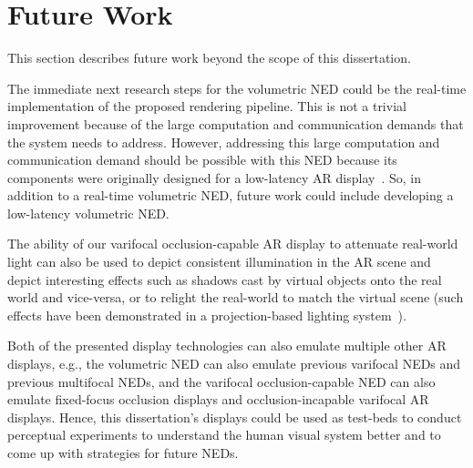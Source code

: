 \section{Future Work}
This section describes future work beyond the scope of this dissertation.

The immediate next research steps for the volumetric NED could be the real-time implementation of the proposed rendering pipeline. This is not a trivial improvement because of the large computation and communication demands that the system needs to address. However, addressing this large computation and communication demand should be possible with this NED because its components were originally designed for a low-latency AR display~\cite{Lincoln2016motion}. So, in addition to a real-time volumetric NED, future work could include developing a low-latency volumetric NED.

The ability of our varifocal occlusion-capable AR display to attenuate real-world light can also be used to depict consistent illumination in the AR scene and depict interesting effects such as shadows cast by virtual objects onto the real world and vice-versa, or to relight the real-world to match the virtual scene (such effects have been demonstrated in a projection-based lighting system~\cite{bimber2003consistent}).

Both of the presented display technologies can also emulate multiple other AR displays, e.g., the volumetric NED can also emulate previous varifocal NEDs and previous multifocal NEDs, and the varifocal occlusion-capable NED can also emulate fixed-focus occlusion displays and occlusion-incapable varifocal AR displays. Hence, this dissertation's displays could be used as test-beds to conduct perceptual experiments to understand the human visual system better and to come up with strategies for future NEDs.
